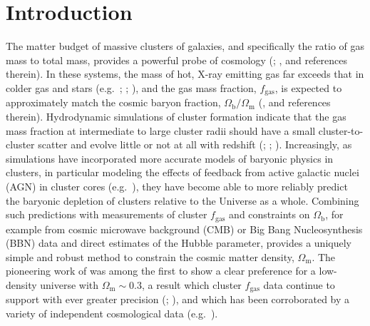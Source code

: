 \documentclass[useAMS,usenatbib,usegraphicx]{mn2e}
\newcommand*{\mysub}[2]{\ensuremath{#1_{\mathrm{#2}}}}
\newcommand*{\Omegam}{\mysub{\Omega}{m}}
\newcommand*{\Omegab}{\mysub{\Omega}{b}}
\newcommand*{\fgas}{\mysub{f}{gas}}
\begin{document}
\clearpage
\section{Introduction} \label{sec:cosintro}

The matter budget of massive clusters of galaxies, and specifically the ratio of gas mass to total mass, provides a powerful probe of cosmology (\citealt{White1993Natur.366..429W, Sasaki9611033, Pen9610090, Allen0205007, Allen0405340, Allen0706.0033}; \citealt*{Allen1103.4829}, and references therein). In these systems, the mass of hot, X-ray emitting gas far exceeds that in colder gas and stars (e.g.\ \citealt{Lin0408557}; \citealt*{Gonzalez0705.1726}; \citealt{Giodini0904.0448, Dai0911.2230, Leauthaud1104.0928, Behroozi1207.6105}), and the gas mass fraction, \fgas{}, is expected to approximately match the cosmic baryon fraction, $\Omegab/\Omegam$ (\citealt{Borgani0906.4370}, and references therein). Hydrodynamic simulations of cluster formation indicate that the gas mass fraction at intermediate to large cluster radii should have a small cluster-to-cluster scatter and evolve little or not at all with redshift (\citealt{Eke9708070, Kay0407058, Crain0610602}; \citealt*{Nagai0609247}; \citealt{Young1007.0887, Battaglia1209.4082, Planelles1209.5058}). Increasingly, as simulations have incorporated more accurate models of baryonic physics in clusters, in particular modeling the effects of feedback from active galactic nuclei (AGN) in cluster cores (e.g.\ \citealt{McNamara0709.2152}), they have become able to more reliably predict the baryonic depletion of clusters relative to the Universe as a whole. Combining such predictions with measurements of cluster \fgas{} and constraints on $\Omegab$, for example from cosmic microwave background (CMB) or Big Bang Nucleosynthesis (BBN) data and direct estimates of the Hubble parameter, provides a uniquely simple and robust method to constrain the cosmic matter density, $\Omegam$. The pioneering work of \citet{White1993Natur.366..429W} was among the first to show a clear preference for a low-density universe with $\Omegam\sim0.3$, a result which cluster \fgas{} data continue to support with ever greater precision (\citealt{Allen0205007, Allen0405340, Allen0706.0033, Ettori0211335, Ettori0904.2740}; \citealt*{Rapetti0409574}), and which has been corroborated by a variety of independent cosmological data (e.g.\ \citealt{Percival0608635, Percival0907.1660, Spergel0603449,  Kowalski0804.4142, Mantz0709.4294, Mantz0909.3098, Dunkley0803.0586, Vikhlinin0812.2720, Rozo0902.3702, Blake1108.2635, Komatsu1001.4538, Hinshaw1212.5226, Suzuki1105.3470, Anderson1303.4666, Benson1112.5435, Hasselfield1301.0816, Planck1303.5076}).
\end{document}
